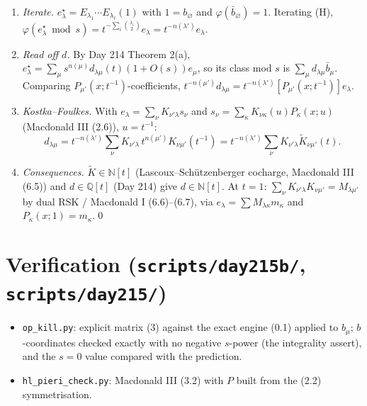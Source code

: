 \documentclass[11pt]{article}
\theoremstyle{definition}
\newcommand{\Q}{\mathbb{Q}}
\newcommand{\N}{\mathbb{N}}
\newcommand{\file}[1]{\texttt{#1}}
\begin{document}
\begin{enumerate}[label=\arabic*.]
\item \emph{Iterate.} $e^\star_\lambda=E_{\lambda_1}\cdots E_{\lambda_\ell}(1)$ with $1=b_\varnothing$ and $\varphi(\bar b_\varnothing)=1$. Iterating (H),
$\varphi(e^\star_\lambda\bmod s)=t^{-\sum_i\binom{\lambda_i}2}e_\lambda=t^{-n(\lambda')}e_\lambda$.
\item \emph{Read off $d$.} By Day 214 Theorem 2(a), $e^\star_\lambda=\sum_\mu s^{n(\mu)}d_{\lambda\mu}(t)(1+O(s))e_\mu$, so its class mod $s$ is $\sum_\mu d_{\lambda\mu}\bar b_\mu$. Comparing $P_{\mu'}(x;t^{-1})$-coefficients,
$t^{-n(\mu')}d_{\lambda\mu}=t^{-n(\lambda')}[P_{\mu'}(x;t^{-1})]e_\lambda$.
\item \emph{Kostka--Foulkes.} With $e_\lambda=\sum_\nu K_{\nu'\lambda}s_\nu$ and $s_\nu=\sum_\kappa K_{\nu\kappa}(u)P_\kappa(x;u)$ (Macdonald III (2.6)), $u=t^{-1}$:
\[d_{\lambda\mu}=t^{-n(\lambda')}\sum_\nu K_{\nu'\lambda}\,t^{n(\mu')}K_{\nu\mu'}(t^{-1})=t^{-n(\lambda')}\sum_\nu K_{\nu'\lambda}\tilde K_{\nu\mu'}(t).\]
\item \emph{Consequences.} $\tilde K\in\N[t]$ (Lascoux--Sch\"utzenberger cocharge, Macdonald III (6.5)) and $d\in\Q[t]$ (Day 214) give $d\in\N[t]$. At $t=1$: $\sum_\nu K_{\nu'\lambda}K_{\nu\mu'}=M_{\lambda\mu'}$ by dual RSK / Macdonald I (6.6)--(6.7), via $e_\lambda=\sum M_{\lambda\kappa}m_\kappa$ and $P_\kappa(x;1)=m_\kappa$.\qed
\end{enumerate}

\section{Verification (\file{scripts/day215b/}, \file{scripts/day215/})}

\begin{itemize}
\item \file{op\_kill.py}: explicit matrix (3) against the exact engine (0.1) applied to $b_\mu$; $b$-coordinates checked exactly with no negative $s$-power (the integrality assert), and the $s=0$ value compared with the prediction.
\item \file{hl\_pieri\_check.py}: Macdonald III (3.2) with $P$ built from the (2.2) symmetrisation.
\end{itemize}
\end{document}
